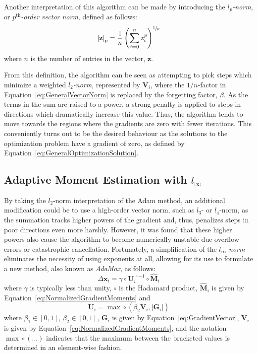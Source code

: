 \documentclass{article}
\begin{document}
Another interpretation of this algorithm can be made by introducing the \emph{$l_p$-norm}, or \emph{$p^{\text{th}}$-order vector norm}, defined as follows:
\begin{equation}
\label{eq:GeneralVectorNorm}
	\left|\mathbf{z}\right|_p = \frac{1}{n} \left(\sum_{i=0}^{n} z_i^p\right)^{\sfrac{1}{p}}
\end{equation}
where $n$ is the number of entries in the vector, $\mathbf{z}$.

From this definition, the algorithm can be seen as attempting to pick steps which minimize a weighted \emph{$l_2$-norm}, represented by $\mathbf{V}_i$, where the $1/n$-factor in Equation~\eqref{eq:GeneralVectorNorm} is replaced by the forgetting factor, $\beta$. As the terms in the sum are raised to a power, a strong penalty is applied to steps in directions which dramatically increase this value. Thus, the algorithm tends to move towards the regions where the gradients are zero with fewer iterations. This conveniently turns out to be the desired behaviour as the solutions to the optimization problem have a gradient of zero, as defined by Equation~\eqref{eq:GeneralOptimizationSolution}.

\subsection{Adaptive Moment Estimation with $l_\infty$}
\label{subsec:AdaMax}

By taking the $l_2$-norm interpretation of the Adam method, an additional modification could be to use a high-order vector norm, such as $l_3$- or $l_4$-norm, as the summation tracks higher powers of the gradient and, thus, penalizes steps in poor directions even more harshly. However, it was found that these higher powers also cause the algorithm to become numerically unstable due overflow errors or catastrophic cancellation. Fortunately, a simplification of the \emph{$l_\infty$-norm} eliminates the necessity of using exponents at all, allowing for its use to formulate a new method, also known as \emph{AdaMax}, as follows:
\begin{equation}
\label{eq:SE_AdaMax}
	\Delta \mathbf{x}_i = \gamma \circ \mathbf{U}_i^{\, \circ-1} \circ \widehat{\mathbf{M}}_i
\end{equation}
where $\gamma$ is typically less than unity, $\circ$ is the Hadamard product, $\widehat{\mathbf{M}}_i$ is given by Equation~\eqref{eq:NormalizedGradientMoments} and
\begin{equation}
\label{eq:InfiniteGradientMoment}
	\mathbf{U}_i = \max \circ \left(\beta_2 \mathbf{V}_i, \left|\mathbf{G}_i\right|\right)
\end{equation}
where $\beta_1 \in \left[0,1\right]$, $\beta_2 \in \left[0,1\right]$, $\mathbf{G}_i$ is given by Equation~\eqref{eq:GradientVector}, $\mathbf{V}_i$ is given by Equation~\eqref{eq:NormalizedGradientMoments}, and the notation $\max \circ \left(...\right)$ indicates that the maximum between the bracketed values is determined in an element-wise fashion.
\end{document}

